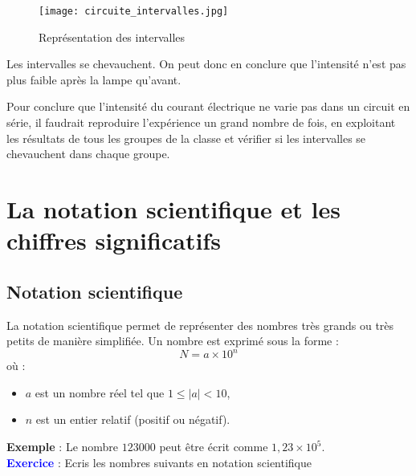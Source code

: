\documentclass[a4paper,12pt]{article}
\begin{document}
\begin{figure}[H]
  \centering
  \texttt{[image: circuite\_intervalles.jpg]}
  \caption{Représentation des intervalles}
\end{figure}

Les intervalles se chevauchent. On peut donc en conclure que l’intensité n’est pas plus faible après la lampe qu’avant.

\vspace{1em}

Pour conclure que l’intensité du courant électrique ne varie pas dans un circuit en série, il faudrait reproduire l’expérience un grand nombre de fois, en exploitant les résultats de tous les groupes de la classe et vérifier si les intervalles se chevauchent dans chaque groupe.


\section{La notation scientifique et les chiffres significatifs}

\subsection{Notation scientifique}

\begin{tcolorbox}[colback=red!10!white, colframe=red!75!black, title=PAR COEUR]
  La notation scientifique permet de représenter des nombres très grands ou très petits de manière simplifiée. Un nombre est exprimé sous la forme :
\[
N = a \times 10^n
\]
où :
\begin{itemize}[noitemsep]
    \item \( a \) est un nombre réel tel que \( 1 \leq |a| < 10 \),
    \item \( n \) est un entier relatif (positif ou négatif).
\end{itemize}
\end{tcolorbox}

\textbf{Exemple} : Le nombre \( 123000 \) peut être écrit comme \( 1,23 \times 10^5 \). \\

\textcolor{blue}{\textbf{Exercice}} : Ecris les nombres suivants en notation scientifique
\vspace{1em}
\end{document}
